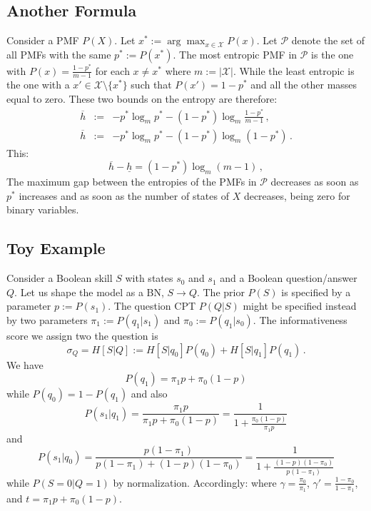 \documentclass[runningheads]{llncs}
\begin{document}
	\subsection*{Another Formula}
	Consider a PMF $P(X)$. Let $x^*:=\arg\max_{x\in\mathcal{X}} P(x)$. Let $\mathcal{P}$ 
	denote the set of all PMFs with the same $p^*:=P(x^*)$. The most entropic PMF in 
	$\mathcal{P}$ is the one with  $P(x)=\frac{1-p^*}{m-1}$ for each $x\neq x^*$ where 
	$m:=|\mathcal{X}|$. While the least entropic is the one with a 
	$x'\in\mathcal{X}\setminus\{x^*\}$ such that $P(x')=1-p^*$ and all the other masses 
	equal to zero. These two bounds on the entropy are therefore:
	\begin{eqnarray}
		\overline{h}&:=& -p^* \log_m p^* - (1-p^*) \log_m \frac{1-p^*}{m-1}\,,\\
		\overline{h}&:=& -p^* \log_m p^* - (1-p^*) \log_m (1-p^*)\,.
	\end{eqnarray}
	This:
	\begin{equation}
		\overline{h}-\underline{h}=(1-p^*) \log_m (m-1)\,,
	\end{equation}
	The maximum gap between the entropies of the PMFs in $\mathcal{P}$ decreases as 
	soon as $p^*$ increases and as soon as the number of states of $X$ decreases, being 
	zero for binary variables.
	
	\subsection*{Toy Example}
	Consider a Boolean skill $S$ with states $s_0$ and $s_1$ and a Boolean 
	question/answer $Q$. Let us shape the model as a BN, $S\to Q$. The prior $P(S)$ is 
	specified by a parameter $p:=P(s_1)$. The question CPT $P(Q|S)$ might be specified 
	instead by two parameters $\pi_1:=P(q_1|s_1)$ and $\pi_0:=P(q_1|s_0)$. The 
	informativeness score we assign two the question is
	\begin{equation}
		\sigma_Q = H[S|Q]:=H[S|q_0]P(q_0)+H[S|q_1]P(q_1)\,.
	\end{equation}
	We have
	\begin{equation}
		P(q_1)=\pi_1 p + \pi_0 (1-p)
	\end{equation}
	while $P(q_0)=1-P(q_1)$ and also
	\begin{equation}
		P(s_1|q_1)=\frac{\pi_1 p}{\pi_1 p + \pi_0 (1-p)}=\frac{1}{1+\frac{\pi_0(1-p)}{\pi_1 p}}
	\end{equation}
	and
	\begin{equation}
		P(s_1|q_0)=\frac{p (1-\pi_1)}{p(1-\pi_1) +  (1-p)(1-\pi_0)} = \frac{1}{1+ \frac{ 
		(1-p)(1-\pi_0)}{p (1-\pi_1)}} 
	\end{equation}
	while $P(S=0|Q=1)$ by normalization. Accordingly:
	where $\gamma = \frac{\pi_0}{\pi_1}$, $\gamma' = \frac{1-\pi_0}{1-\pi_1}$, and $t = \pi_1 
	p + \pi_0 (1-p)$.
	
\end{document}
